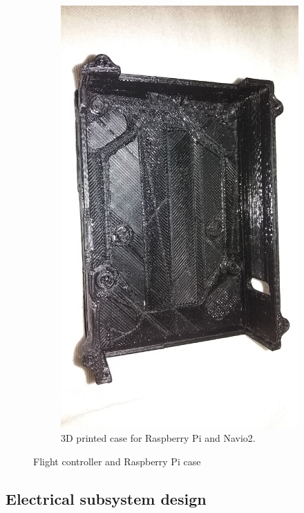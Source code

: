 \begin{figure}[H]
\begin{subfigure}{0.5\textwidth}
\includegraphics[scale=0.1]{images/drone-build-3dcase.jpg}
\caption{3D printed case for Raspberry Pi and Navio2.}
\label{fig:fcarpc2}
\end{subfigure}
\caption{Flight controller and Raspberry Pi case}
\label{fig:fcarpc}
\end{figure}

\subsection{Electrical subsystem design}

